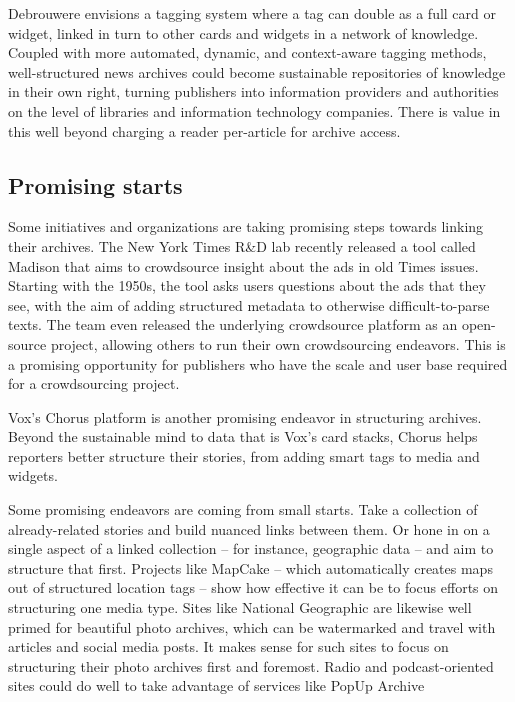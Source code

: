 Debrouwere envisions a tagging system where a tag can double as a full card or widget, linked in turn to other cards and widgets in a network of knowledge. Coupled with more automated, dynamic, and context-aware tagging methods, well-structured news archives could become sustainable repositories of knowledge in their own right, turning publishers into information providers and authorities on the level of libraries and information technology companies. There is value in this well beyond charging a reader per-article for archive access.

\subsection{Promising starts}

Some initiatives and organizations are taking promising steps towards linking their archives. The New York Times R&D lab recently released a tool called Madison that aims to crowdsource insight about the ads in old Times issues. Starting with the 1950s, the tool asks users questions about the ads that they see, with the aim of adding structured metadata to otherwise difficult-to-parse texts. The team even released the underlying crowdsource platform as an open-source project, allowing others to run their own crowdsourcing endeavors. This is a promising opportunity for publishers who have the scale and user base required for a crowdsourcing project.


Vox's Chorus platform is another promising endeavor in structuring archives. Beyond the sustainable mind to data that is Vox's card stacks, Chorus helps reporters better structure their stories, from adding smart tags to media and widgets.


Some promising endeavors are coming from small starts. Take a collection of already-related stories and build nuanced links between them. Or hone in on a single aspect of a linked collection -- for instance, geographic data -- and aim to structure that first. Projects like MapCake -- which automatically creates maps out of structured location tags -- show how effective it can be to focus efforts on structuring one media type. Sites like National Geographic are likewise well primed for beautiful photo archives, which can be watermarked and travel with articles and social media posts. It makes sense for such sites to focus on structuring their photo archives first and foremost. Radio and podcast-oriented sites could do well to take advantage of services like PopUp Archive

